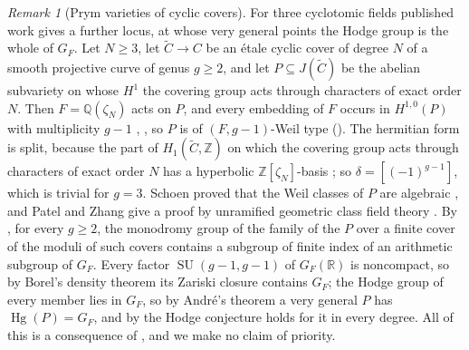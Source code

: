 \documentclass[11pt,reqno]{amsart}
\theoremstyle{plain}
\theoremstyle{definition}
\theoremstyle{remark}
\newtheorem{remark}[theorem]{Remark}
\newcommand{\QQ}{\mathbb{Q}}
\newcommand{\ZZ}{\mathbb{Z}}
\newcommand{\RR}{\mathbb{R}}
\DeclareMathOperator{\Hg}{Hg}
\DeclareMathOperator{\SU}{SU}
\begin{document}
\begin{remark}[Prym varieties of cyclic covers]\label{rem:quarticprym}
For three cyclotomic fields published work gives a further locus, at whose
very general points the Hodge group is the whole of $G_{F}$. Let $N\ge3$,
let $\widetilde C\to C$ be an \'etale cyclic cover of degree $N$ of a smooth
projective curve of genus
$g\ge2$, and let $P\subseteq J(\widetilde C)$ be the abelian subvariety on
whose $H^{1}$ the covering group acts through characters of exact order $N$.
Then $F=\QQ(\zeta_{N})$ acts on $P$, and every embedding of $F$ occurs in
$H^{1,0}(P)$ with multiplicity $g-1$ \cite[Lemma~1.6a]{Sch88},
\cite[Lemma~5.1]{PZ25}, so $P$ is of $(F,g-1)$-Weil type
(\cite[Remark~17.2]{paperI}). The hermitian form is split, because the part of
$H_{1}(\widetilde C,\ZZ)$ on which the covering group acts through
characters of exact order $N$ has a hyperbolic $\ZZ[\zeta_{N}]$-basis
\cite[Proposition~2.2]{Loo97}; so $\delta=[(-1)^{g-1}]$, which is trivial for
$g=3$. Schoen proved that the Weil classes of $P$ are algebraic
\cite[Theorem~2.0 with $r=0$, Corollary~3.1]{Sch88}, and Patel and Zhang give
a proof by unramified geometric class field theory
\cite[Theorems~1.1, 1.2 and~5.3, Remark~3.7]{PZ25}. By
\cite[Theorem~2.4]{Loo97}, for every $g\ge2$, the monodromy group of the
family of the $P$ over a finite cover of the moduli of such covers contains a
subgroup of finite index of an arithmetic subgroup of $G_{F}$. Every factor
$\SU(g-1,g-1)$ of $G_{F}(\RR)$ is noncompact, so by Borel's density theorem
\cite{Bor60} its Zariski closure contains $G_{F}$; the Hodge group of every
member lies in $G_{F}$, so by Andr\'e's theorem \cite[Theorem~1]{And92} a very
general $P$ has $\Hg(P)=G_{F}$, and by \cite[Proposition~17.3(iii)]{paperI} the Hodge
conjecture holds for it in every degree. All of this is a consequence of
\cite{Sch88,Loo97,And92}, and we make no claim of priority.


\end{remark}
\end{document}
